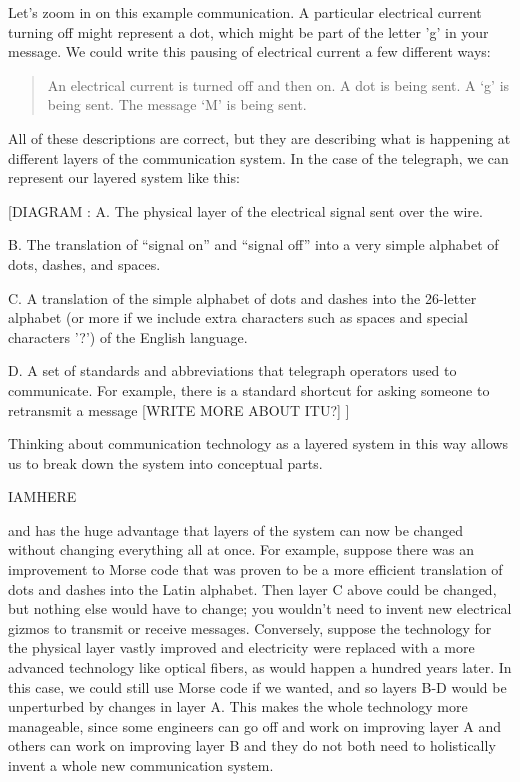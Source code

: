\documentclass[UTF8]{book}
\begin{document}
\begin{CJK}{UTF8}{gbsn}
Let's zoom in on this example communication. A particular electrical current turning off might represent a dot, which might be part of the letter 'g' in your message. We could write this pausing of electrical current a few different ways:

\begin{quotation}
\centering
An electrical current is turned off and then on.
A dot is being sent.
A `g' is being sent.
The message `M' is being sent.
\end{quotation}

All of these descriptions are correct, but they are describing what is happening at different layers of the communication system. In the case of the telegraph, we can represent our layered system like this:

[DIAGRAM :
A. The physical layer of the electrical signal sent over the wire.

B. The translation of “signal on” and “signal off” into a very simple alphabet of dots, dashes, and spaces.

C. A translation of the simple alphabet of dots and dashes into the 26-letter alphabet (or more if we include extra characters such as spaces and special characters '?') of the English language.

D. A set of standards and abbreviations that telegraph operators used to communicate. For example, there is a standard shortcut for asking someone to retransmit a message [WRITE MORE ABOUT ITU?]
]

Thinking about communication technology as a layered system in this way allows us to break down the system into conceptual parts.

IAMHERE


and has the huge advantage that layers of the system can now be changed without changing everything all at once. For example, suppose there was an improvement to Morse code that was proven to be a more efficient translation of dots and dashes into the Latin alphabet. Then layer C above could be changed, but nothing else would have to change; you wouldn't need to invent new electrical gizmos to transmit or receive messages. Conversely, suppose the technology for the physical layer vastly improved and electricity were replaced with a more advanced technology like optical fibers, as would happen a hundred years later. In this case, we could still use Morse code if we wanted, and so layers B-D would be unperturbed by changes in layer A. This makes the whole technology more manageable, since some engineers can go off and work on improving layer A and others can work on improving layer B and they do not both need to holistically invent a whole new communication system.


\end{CJK}
\end{document}

